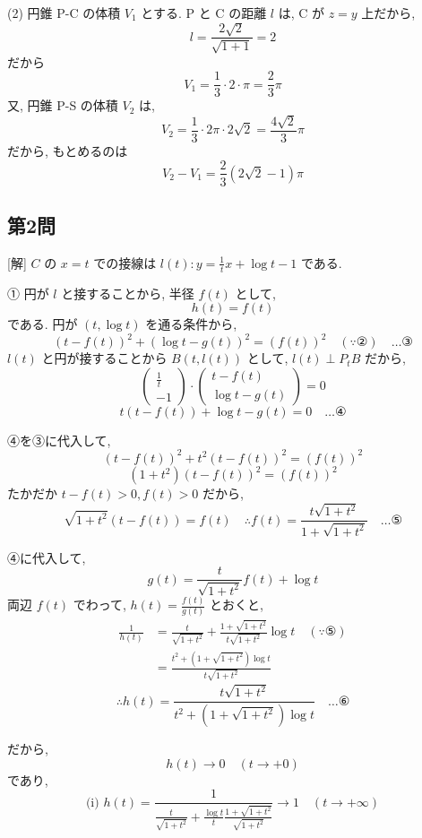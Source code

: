 \documentclass[../main.tex]{subfiles}
\begin{document}
(2) 円錐 P-C の体積 $V_1$ とする. P と C の距離 $l$ は, C が $z=y$ 上だから,
\[
  l = \frac{2\sqrt{2}}{\sqrt{1+1}} = 2
\]
だから
\[
  V_1 = \frac{1}{3} \cdot 2 \cdot \pi = \frac{2}{3}\pi
\]
又, 円錐 P-S の体積 $V_2$ は,
\[
  V_2 = \frac{1}{3} \cdot 2\pi \cdot 2\sqrt{2} = \frac{4\sqrt{2}}{3}\pi
\]
だから, もとめるのは
\[
  V_2 - V_1 = \frac{2}{3}(2\sqrt{2}-1)\pi
\]

\subsection*{第2問}

[解] $C$ の $x=t$ での接線は $l(t): y = \frac{1}{t} x + \log t - 1$ である.

① 円が $l$ と接することから, 半径 $f(t)$ として,
\[
  h(t) = f(t)
\]
である. 円が $(t, \log t)$ を通る条件から,
\[
  (t - f(t))^2 + (\log t - g(t))^2 = (f(t))^2 \quad (\because \text{②}) \quad \dots \text{③}
\]
$l(t)$ と円が接することから $B(t, l(t))$ として, $l(t) \perp P_t B$ だから,
\[
  \begin{pmatrix} \frac{1}{t} \\ -1
  \end{pmatrix} \cdot
  \begin{pmatrix} t - f(t) \\ \log t - g(t)
  \end{pmatrix} = 0
\]
\[
  t(t - f(t)) + \log t - g(t) = 0 \quad \dots \text{④}
\]

④を③に代入して,
\[
  (t - f(t))^2 + t^2 (t - f(t))^2 = (f(t))^2
\]
\[
  (1+t^2)(t - f(t))^2 = (f(t))^2
\]
たかだか $t - f(t) > 0, f(t) > 0$ だから,
\[
  \sqrt{1+t^2} (t - f(t)) = f(t) \quad \therefore f(t) = \frac{t\sqrt{1+t^2}}{1+\sqrt{1+t^2}} \quad \dots \text{⑤}
\]

④に代入して,
\[
  g(t) = \frac{t}{\sqrt{1+t^2}} f(t) + \log t
\]
両辺 $f(t)$ でわって, $h(t) = \frac{f(t)}{g(t)}$ とおくと,
\begin{align*}
  \frac{1}{h(t)} &= \frac{t}{\sqrt{1+t^2}} + \frac{1+\sqrt{1+t^2}}{t\sqrt{1+t^2}} \log t \quad (\because \text{⑤}) \\
  &= \frac{t^2 + (1+\sqrt{1+t^2}) \log t}{t\sqrt{1+t^2}}
\end{align*}
\[
  \therefore h(t) = \frac{t\sqrt{1+t^2}}{t^2 + (1+\sqrt{1+t^2}) \log t} \quad \dots \text{⑥}
\]

だから,
\[
  h(t) \to 0 \quad (t \to +0)
\]
であり,
\[
  \text{(i) } h(t) = \frac{1}{\frac{t}{\sqrt{1+t^2}} + \frac{\log t}{t} \frac{1+\sqrt{1+t^2}}{\sqrt{1+t^2}}} \to 1 \quad (t \to +\infty)
\]
\end{document}
